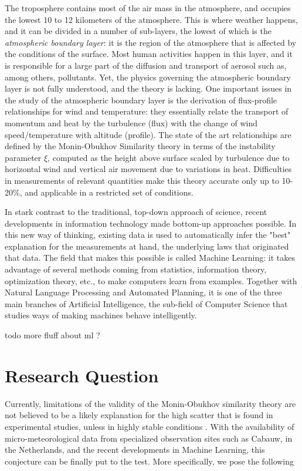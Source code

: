 \documentclass[12pt]{book}
\begin{document}
The troposphere contains most of the air mass in the atmosphere, and occupies the lowest 10 to 12 kilometers of the atmosphere. This is where weather happens, and it can be divided in a number of sub-layers, the lowest of which is the \emph{atmospheric boundary layer}: it is the region of the atmosphere that is affected by the conditions of the surface. Most human activities happen in this layer, and it is responsible for a large part of the diffusion and transport of aerosol such as, among others, pollutants. Yet, the physics governing the atmospheric boundary layer is not fully understood, and the theory is lacking. One important issues in the study of the atmospheric boundary layer is the derivation of flux-profile relationships for wind and temperature: they essentially relate the transport of momentum and heat by the turbulence (flux) with the change of wind speed/temperature with altitude (profile). The state of the art relationships are defined by the Monin-Obukhov Similarity theory in terms of the instability parameter $\xi$, computed as the height above surface scaled by turbulence due to horizontal wind and vertical air movement due to variations in heat. Difficulties in measurements of relevant quantities make this theory accurate only up to 10-20\%, and applicable in a restricted set of conditions.

In stark contrast to the traditional, top-down approach of science, recent developments in information technology made bottom-up approaches possible. In this new way of thinking, existing data is used to automatically infer the "best" explanation for the measurements at hand, the underlying laws that originated that data. The field that makes this possible is called Machine Learning: it takes advantage of several methods coming from statistics, information theory, optimization theory, etc., to make computers learn from examples. Together with Natural Language Processing and Automated Planning, it is one of the three main branches of Artificial Intelligence, the sub-field of Computer Science that studies ways of making machines behave intelligently.

todo more fluff about ml ?

\section{Research Question}
Currently, limitations of the validity of the Monin-Obukhov similarity theory are not believed to be a likely explanation for the high scatter that is found in experimental studies, unless in highly stable conditions \cite{basicatm}. With the availability of micro-meteorological data from specialized observation sites such as Cabauw, in the Netherlands, and the recent developments in Machine Learning, this conjecture can be finally put to the test. More specifically, we pose the following \\
\end{document}
